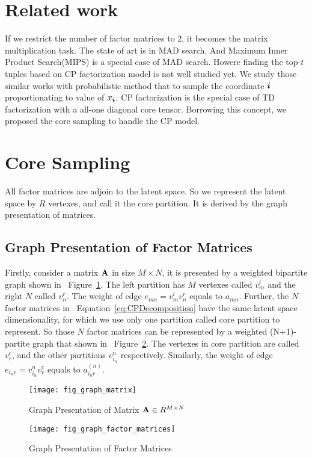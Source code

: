 \documentclass[letterpaper]{article}
\newcommand{\V}[1]{{\bm{{\MakeLowercase{#1}}}}}
\newcommand{\M}[1]{{\bm{\mathbf{\MakeUppercase{#1}}}}}
\newcommand{\Eqn}[1]   {Equation~\ref{eq:#1}}
\newcommand{\Fig}[1]   {Figure~\ref{fig:#1}}
\begin{document}
\section{Related work}
If we restrict the number of factor matrices to $2$,
it becomes the matrix multiplication task.
The state of art\cite{BaPiKoSe15} is in MAD search.
And Maximum Inner Product Search(MIPS)\cite{Cohen97,Ram12}
is a special case of MAD search.
Howere finding the top-$t$ tuples based on CP factorization model is not well studied yet.
We study those similar works with probabilistic method that
to sample the coordinate $\V{i}$  proportionating to value of $x_{\V{i}}$.
CP factorization is the special case of TD factorization with a all-one diagonal core tensor.
Borrowing this concept, we proposed the core sampling to handle the CP model.

\section{Core Sampling}
All factor matrices are adjoin to the latent space.
So we represent the latent space by $R$ vertexes, and call it the core partition.
It is derived by the graph presentation of matrices.

\subsection{Graph Presentation of Factor Matrices}
Firstly, consider a matrix $\M{A}$ in size $M \times N$,
it is presented by a weighted bipartite graph shown in ~\Fig{GraphMatrix}.
The left partition has $M$ vertexes called $v^l_m$ and the right $N$ called $v^r_n$.
The weight of edge $e_{mn} = v^l_mv^r_n$ equals to $a_{mn}$.
Further, the $N$ factor matrices in ~\Eqn{CPDecomposition}
have the same latent space dimensionality,
for which we use only one partition called core partition to represent.
So those $N$ factor matrices can be represented by a weighted (N+1)-partite graph
that shown in ~\Fig{GraphMatrices}.
The vertexes in core partition are called $v^c_r$,
and the other partitions $v^{n}_{i_n}$ respectively.
Similarly, the weight of edge $e_{i_nr} = v^{n}_{i_n}v^c_r$ equals to $a^{(n)}_{i_nr}$.
\begin{figure}[t]
  \centering
  \texttt{[image: fig\_graph\_matrix]}\\
  \caption{Graph Presentation of Matrix $\M{A} \in R^{M \times N}$}
  \label{fig:GraphMatrix}
\end{figure}
\begin{figure}[t]
  \centering
  \texttt{[image: fig\_graph\_factor\_matrices]}\\
  \caption{Graph Presentation of Factor Matrices}
  \label{fig:GraphMatrices}
\end{figure}
\end{document}
